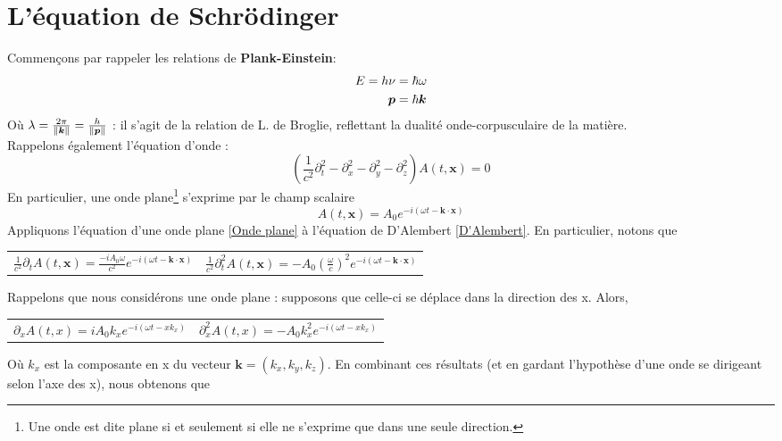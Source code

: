 \documentclass[../notesdecours]{subfiles}
\begin{document}
\part{L'équation de Schrödinger}
Commençons par rappeler les relations de \textbf{Plank-Einstein}:
\begin{align}
E = h \nu &= \hbar \omega\\
\bm{p} &= \hbar \bm{k}
\end{align}
Où $\lambda = \frac{2\pi}{\norm{\bm{k}}} = \frac{h}{\norm{\bm{p}}}$ : il s'agit de la relation de L. de Broglie, reflettant la dualité onde-corpusculaire de la matière.\\

Rappelons également l'équation d'onde :
\begin{equation}
\label{D'Alembert}
\left( \frac{1}{c^2} \partial_t^2 - \partial_x^2 - \partial_y^2 - \partial_z^2 \right)A(t,\bm{x}) = 0
\end{equation}
En particulier, une onde plane\footnote{Une onde est dite plane si et seulement si elle ne s'exprime que dans une seule direction.} s'exprime par le champ scalaire 
\begin{equation}
\label{Onde plane Sch}
A(t,\bm{x}) = A_0 e^{-i \left( \omega t - \bm{k} \cdot \bm{x} \right) }
\end{equation}
Appliquons l'équation d'une onde plane \ref{Onde plane} à l'équation de D'Alembert \ref{D'Alembert}. En particulier, notons que
\begin{center}
\begin{tabular}{c c}
$\frac{1}{c^2} \partial_t A(t,\bm{x}) = \frac{-iA_0 \omega}{c^2} e^{-i \left( \omega t - \bm{k} \cdot \bm{x} \right)}$ & $\frac{1}{c^2} \partial_t^2 A(t,\bm{x}) = - A_0 \left( \frac{\omega}{c}\right)^2 e^{-i \left( \omega t - \bm{k} \cdot \bm{x} \right)}$\\
\end{tabular}
\end{center}
Rappelons que nous considérons une onde plane : supposons que celle-ci se déplace dans la direction des x. Alors,
\begin{center}
\begin{tabular}{c c}
$\partial_x A(t,x) = iA_0k_x e^{-i \left( \omega t - xk_x \right)}$ & $\partial_x^2 A(t,x) = -A_0k_x^2 e^{-i \left( \omega t - xk_x \right)}$
\end{tabular}
\end{center}
Où $k_x$ est la composante en x du vecteur $\bm{k} = \left( k_x,k_y,k_z \right)$. En combinant ces résultats (et en gardant l'hypothèse d'une onde se dirigeant selon l'axe des x), nous obtenons que
\end{document}
